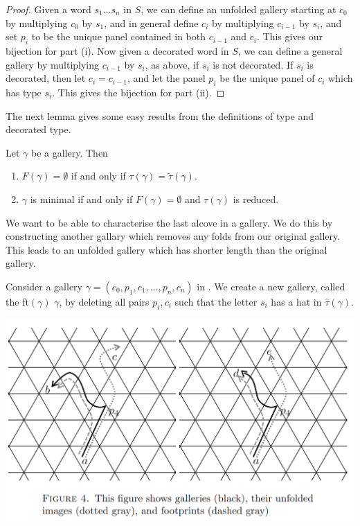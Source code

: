 \documentclass[11pt]{article}
\begin{document}
\begin{proof}
    Given a word $s_1\hdots s_n$ in $S$, we can define an unfolded gallery starting at $c_0$ by multiplying $c_0$ by $s_1$, and in general define $c_i$ by multiplying $c_{i-1}$ by $s_{i}$, and set $p_i$ to be the unique panel contained in both $c_{i-1}$ and $c_i$. This gives our bijection for part (i). 
    Now given a decorated word in $S$, we can define a general gallery by multiplying $c_{i-1}$ by $s_{i}$, as above, if $s_{i}$ is not decorated. If $s_{i}$ is decorated, then let $c_i=c_{i-1}$, and let the panel $p_i$ be the unique panel of $c_i$ which has type $s_i$. This gives the bijection for part (ii). 
\end{proof}

The next lemma gives some easy results from the definitions of type and decorated type. 

\begin{lemma}\cite[p.128]{SHA}
    Let $\gamma$ be a gallery. Then
    \begin{enumerate}
        \item $F(\gamma)=\emptyset$ if and only if $\tau(\gamma)=\tilde{\tau}(\gamma).$
        \item $\gamma$ is minimal if and only if $F(\gamma)=\emptyset$ and $\tau(\gamma)$ is reduced.
    \end{enumerate}
\end{lemma}

We want to be able to characterise the last alcove in a gallery. We do this by constructing another gallary which removes any folds from our original gallery. This leads to an unfolded gallery which has shorter length than the original gallery.

\begin{definition}
    Consider a gallery $\gamma = (c_0,p_1,c_1,...,p_n,c_n)$ in \sg. We create a new gallery, called the  ft$(\gamma)$  $\gamma$, by deleting all pairs $p_i,c_i$ such that the letter $s_i$ has a hat in $\hat{\tau}(\gamma)$. 

\end{definition}

\includegraphics[scale=0.6]{Screenshot 2023-02-03 133522.png}\\
\end{document}
